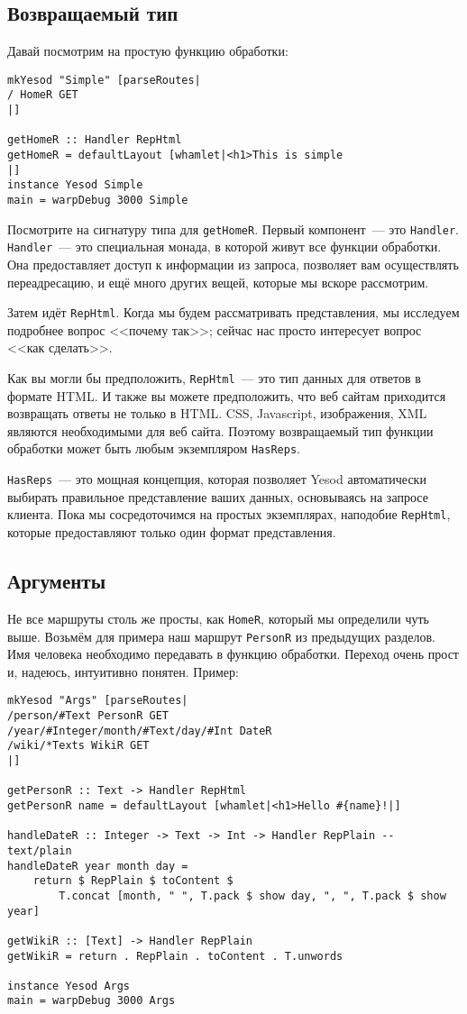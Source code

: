 \subsection{Возвращаемый тип}
Давай посмотрим на простую функцию обработки:
\begin{lstlisting}
mkYesod "Simple" [parseRoutes|
/ HomeR GET
|]

getHomeR :: Handler RepHtml
getHomeR = defaultLayout [whamlet|<h1>This is simple
|]
instance Yesod Simple
main = warpDebug 3000 Simple
\end{lstlisting}

Посмотрите на сигнатуру типа для \lstinline!getHomeR!. Первый
компонент~--- это \lstinline!Handler!. \lstinline!Handler!~--- это
специальная монада, в которой живут все функции обработки. Она
предоставляет доступ к информации из запроса, позволяет вам
осуществлять переадресацию, и ещё много других вещей, которые мы
вскоре рассмотрим.

Затем идёт \lstinline!RepHtml!. Когда мы будем рассматривать
представления, мы исследуем подробнее вопрос <<почему так>>; сейчас
нас просто интересует вопрос <<как сделать>>.

Как вы могли бы предположить, \lstinline!RepHtml!~--- это тип данных
для ответов в формате HTML. И также вы можете предположить, что веб
сайтам приходится возвращать ответы не только в HTML. CSS, Javascript,
изображения, XML являются необходимыми для веб сайта. Поэтому
возвращаемый тип функции обработки может быть любым экземпляром
\lstinline!HasReps!.

\lstinline!HasReps!~--- это мощная концепция, которая позволяет Yesod
автоматически выбирать правильное представление ваших данных,
основываясь на запросе клиента. Пока мы сосредоточимся на простых
экземплярах, наподобие \lstinline!RepHtml!, которые предоставляют
только один формат представления.

\subsection{Аргументы}
Не все маршруты столь же просты, как \lstinline!HomeR!, который мы
определили чуть выше. Возьмём для примера наш маршрут
\lstinline!PersonR! из предыдущих разделов. Имя человека необходимо
передавать в функцию обработки. Переход очень прост и, надеюсь,
интуитивно понятен. Пример:
\begin{lstlisting}
mkYesod "Args" [parseRoutes|
/person/#Text PersonR GET
/year/#Integer/month/#Text/day/#Int DateR
/wiki/*Texts WikiR GET
|]

getPersonR :: Text -> Handler RepHtml
getPersonR name = defaultLayout [whamlet|<h1>Hello #{name}!|]

handleDateR :: Integer -> Text -> Int -> Handler RepPlain -- text/plain
handleDateR year month day =
    return $ RepPlain $ toContent $
        T.concat [month, " ", T.pack $ show day, ", ", T.pack $ show year]

getWikiR :: [Text] -> Handler RepPlain
getWikiR = return . RepPlain . toContent . T.unwords

instance Yesod Args
main = warpDebug 3000 Args
\end{lstlisting}

